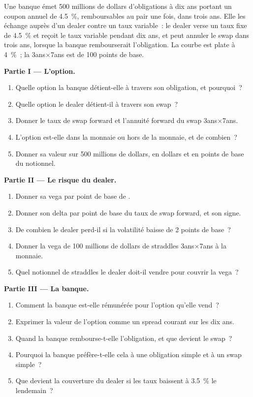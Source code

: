 \begin{problem}\label{pb:m2:the-rates-options-market:1}
Une banque émet 500 millions de dollars d'obligations à dix ans portant un coupon annuel de 4.5~\%,
remboursables au pair une fois, dans trois ans. Elle les échange auprès d'un dealer
contre un taux variable~: le dealer verse un taux fixe de 4.5~\% et reçoit le taux variable pendant dix ans, et
peut annuler le swap dans trois ans, lorsque la banque rembourserait l'obligation. La
courbe est plate à 4~\%~; la  3ans$\times$7ans est de 100 points de base.

\medskip\noindent\textbf{Partie I --- L'option.}
\begin{enumerate}
\item Quelle option la banque détient-elle à travers son obligation, et pourquoi~?
\item Quelle option le dealer détient-il à travers son swap~?
\item Donner le taux de swap forward et l'annuité forward du swap 3ans$\times$7ans.
\item L'option est-elle dans la monnaie ou hors de la monnaie, et de combien~?
\item Donner sa valeur sur 500 millions de dollars, en dollars et en points de base du notionnel.
\end{enumerate}

\medskip\noindent\textbf{Partie II --- Le risque du dealer.}
\begin{enumerate}[resume]
\item Donner sa vega par point de base de .
\item Donner son delta par point de base du taux de swap forward, et son signe.
\item De combien le dealer perd-il si la volatilité baisse de 2 points de base~?
\item Donner la vega de 100 millions de dollars de straddles 3ans$\times$7ans à la monnaie.
\item Quel notionnel de straddles le dealer doit-il vendre pour couvrir la vega~?
\end{enumerate}

\medskip\noindent\textbf{Partie III --- La banque.}
\begin{enumerate}[resume]
\item Comment la banque est-elle rémunérée pour l'option qu'elle vend~?
\item Exprimer la valeur de l'option comme un spread courant sur les dix ans.
\item Quand la banque rembourse-t-elle l'obligation, et que devient le swap~?
\item Pourquoi la banque préfère-t-elle cela à une obligation simple et à un swap simple~?
\item Que devient la couverture du dealer si les taux baissent à 3.5~\% le lendemain~?
\end{enumerate}


\end{problem}
